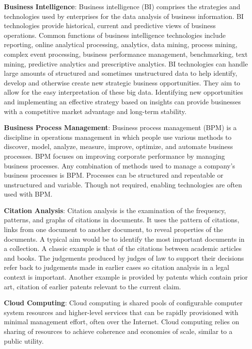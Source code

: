 \documentclass[]{book}
\theoremstyle{definition}
\theoremstyle{definition}
\theoremstyle{definition}
\theoremstyle{remark}
\begin{document}
\textbf{Business Intelligence}: Business intelligence (BI) comprises the
strategies and technologies used by enterprises for the data analysis of
business information. BI technologies provide historical, current and
predictive views of business operations. Common functions of business
intelligence technologies include reporting, online analytical
processing, analytics, data mining, process mining, complex event
processing, business performance management, benchmarking, text mining,
predictive analytics and prescriptive analytics. BI technologies can
handle large amounts of structured and sometimes unstructured data to
help identify, develop and otherwise create new strategic business
opportunities. They aim to allow for the easy interpretation of these
big data. Identifying new opportunities and implementing an effective
strategy based on insights can provide businesses with a competitive
market advantage and long-term stability.

\textbf{Business Process Management}: Business process management (BPM)
is a discipline in operations management in which people use various
methods to discover, model, analyze, measure, improve, optimize, and
automate business processes. BPM focuses on improving corporate
performance by managing business processes. Any combination of methods
used to manage a company's business processes is BPM. Processes can be
structured and repeatable or unstructured and variable. Though not
required, enabling technologies are often used with BPM.

\textbf{Citation Analysis}: Citation analysis is the examination of the
frequency, patterns, and graphs of citations in documents. It uses the
pattern of citations, links from one document to another document, to
reveal properties of the documents. A typical aim would be to identify
the most important documents in a collection. A classic example is that
of the citations between academic articles and books. The judgements
produced by judges of law to support their decisions refer back to
judgements made in earlier cases so citation analysis in a legal context
is important. Another example is provided by patents which contain prior
art, citation of earlier patents relevant to the current claim.

\textbf{Cloud Computing}: Cloud computing is shared pools of
configurable computer system resources and higher-level services that
can be rapidly provisioned with minimal management effort, often over
the Internet. Cloud computing relies on sharing of resources to achieve
coherence and economies of scale, similar to a public utility.
\end{document}
